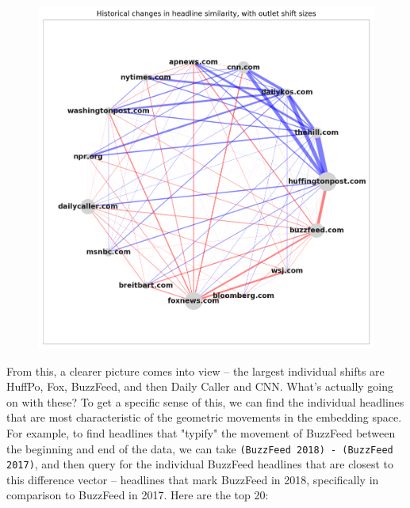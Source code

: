\documentclass{scrartcl}
\begin{document}
\begin{figure}[H]
  \centering
  \includegraphics[height=0.5\textheight]{figures/ts-ab-radial-magnitude.png}
\end{figure}

From this, a clearer picture comes into view -- the largest individual shifts are HuffPo, Fox, BuzzFeed, and then Daily Caller and CNN. What's actually going on with these? To get a specific sense of this, we can find the individual headlines that are most characteristic of the geometric movements in the embedding space. For example, to find headlines that "typify" the movement of BuzzFeed between the beginning and end of the data, we can take \texttt{(BuzzFeed 2018) - (BuzzFeed 2017)}, and then query for the individual BuzzFeed headlines that are closest to this difference vector -- headlines that mark BuzzFeed in 2018, specifically in comparison to BuzzFeed in 2017. Here are the top 20:
\end{document}
